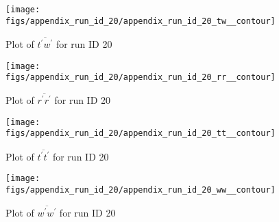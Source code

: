 \begin{figure}[H]
\centering
\texttt{[image: figs/appendix\_run\_id\_20/appendix\_run\_id\_20\_tw\_\_contour]}
\caption{Plot of $\overline{t^\prime w^\prime}$ for run ID 20}
\label{fig:appendix_run_id_20_tw__contour}
\end{figure}


\begin{figure}[H]
\centering
\texttt{[image: figs/appendix\_run\_id\_20/appendix\_run\_id\_20\_rr\_\_contour]}
\caption{Plot of $\overline{r^\prime r^\prime}$ for run ID 20}
\label{fig:appendix_run_id_20_rr__contour}
\end{figure}


\begin{figure}[H]
\centering
\texttt{[image: figs/appendix\_run\_id\_20/appendix\_run\_id\_20\_tt\_\_contour]}
\caption{Plot of $\overline{t^\prime t^\prime}$ for run ID 20}
\label{fig:appendix_run_id_20_tt__contour}
\end{figure}


\begin{figure}[H]
\centering
\texttt{[image: figs/appendix\_run\_id\_20/appendix\_run\_id\_20\_ww\_\_contour]}
\caption{Plot of $\overline{w^\prime w^\prime}$ for run ID 20}
\label{fig:appendix_run_id_20_ww__contour}
\end{figure}


